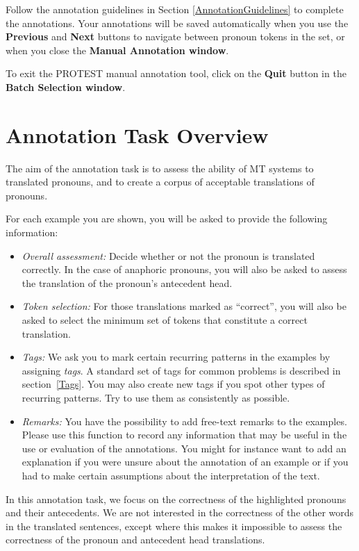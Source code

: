 \documentclass[11pt]{article} %
\begin{document}
Follow the annotation guidelines in Section \ref{AnnotationGuidelines} to complete the annotations. Your annotations will be saved automatically when you use the \textbf{Previous} and \textbf{Next} buttons to navigate between pronoun tokens in the set, or when you close the \textbf{Manual Annotation window}.

To exit the PROTEST manual annotation tool, click on the \textbf{Quit} button in the \textbf{Batch Selection window}.


\section{Annotation Task Overview}
The aim of the annotation task is to assess the ability of MT systems to translated pronouns, and to create a corpus of acceptable translations of pronouns.

For each example you are shown, you will be asked to provide the following information:
\begin{itemize}
\item\emph{Overall assessment:} Decide whether or not the pronoun is translated
	correctly. In the case of anaphoric pronouns, you will also be asked to
	assess the translation of the pronoun's antecedent head.
\item\emph{Token selection:} For those translations marked as ``correct'', you
	will also be asked to select the minimum set of tokens that constitute
	a correct translation.
\item\emph{Tags:} We ask you to mark certain recurring patterns in the examples
	by assigning \emph{tags}. A standard set of tags for common problems is
	described in section~\ref{Tags}. You may also create new tags if you spot
	other types of recurring patterns. Try to use them as consistently as
	possible.
\item\emph{Remarks:} You have the possibility to add free-text remarks to the examples.
	Please use this function to record any information that may be useful in
	the use or evaluation of the annotations. You might for instance want to add
	an explanation if you were unsure about the annotation of an example or if
	you had to make certain assumptions about the interpretation of the text.
\end{itemize}

In this annotation task, we focus on the correctness of the highlighted
pronouns and their antecedents. We are not interested in the correctness of the
other words in the translated sentences, except where this makes it impossible
to assess the correctness of the pronoun and antecedent head translations.
\end{document}
